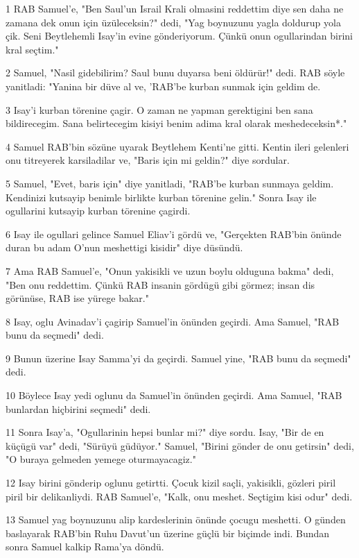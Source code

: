\par 1 RAB Samuel'e, "Ben Saul'un Israil Krali olmasini reddettim diye sen daha ne zamana dek onun için üzüleceksin?" dedi, "Yag boynuzunu yagla doldurup yola çik. Seni Beytlehemli Isay'in evine gönderiyorum. Çünkü onun ogullarindan birini kral seçtim."
\par 2 Samuel, "Nasil gidebilirim? Saul bunu duyarsa beni öldürür!" dedi. RAB söyle yanitladi: "Yanina bir düve al ve, 'RAB'be kurban sunmak için geldim de.
\par 3 Isay'i kurban törenine çagir. O zaman ne yapman gerektigini ben sana bildirecegim. Sana belirtecegim kisiyi benim adima kral olarak meshedeceksin*."
\par 4 Samuel RAB'bin sözüne uyarak Beytlehem Kenti'ne gitti. Kentin ileri gelenleri onu titreyerek karsiladilar ve, "Baris için mi geldin?" diye sordular.
\par 5 Samuel, "Evet, baris için" diye yanitladi, "RAB'be kurban sunmaya geldim. Kendinizi kutsayip benimle birlikte kurban törenine gelin." Sonra Isay ile ogullarini kutsayip kurban törenine çagirdi.
\par 6 Isay ile ogullari gelince Samuel Eliav'i gördü ve, "Gerçekten RAB'bin önünde duran bu adam O'nun meshettigi kisidir" diye düsündü.
\par 7 Ama RAB Samuel'e, "Onun yakisikli ve uzun boylu olduguna bakma" dedi, "Ben onu reddettim. Çünkü RAB insanin gördügü gibi görmez; insan dis görünüse, RAB ise yürege bakar."
\par 8 Isay, oglu Avinadav'i çagirip Samuel'in önünden geçirdi. Ama Samuel, "RAB bunu da seçmedi" dedi.
\par 9 Bunun üzerine Isay Samma'yi da geçirdi. Samuel yine, "RAB bunu da seçmedi" dedi.
\par 10 Böylece Isay yedi oglunu da Samuel'in önünden geçirdi. Ama Samuel, "RAB bunlardan hiçbirini seçmedi" dedi.
\par 11 Sonra Isay'a, "Ogullarinin hepsi bunlar mi?" diye sordu. Isay, "Bir de en küçügü var" dedi, "Sürüyü güdüyor." Samuel, "Birini gönder de onu getirsin" dedi, "O buraya gelmeden yemege oturmayacagiz."
\par 12 Isay birini gönderip oglunu getirtti. Çocuk kizil saçli, yakisikli, gözleri piril piril bir delikanliydi. RAB Samuel'e, "Kalk, onu meshet. Seçtigim kisi odur" dedi.
\par 13 Samuel yag boynuzunu alip kardeslerinin önünde çocugu meshetti. O günden baslayarak RAB'bin Ruhu Davut'un üzerine güçlü bir biçimde indi. Bundan sonra Samuel kalkip Rama'ya döndü.
